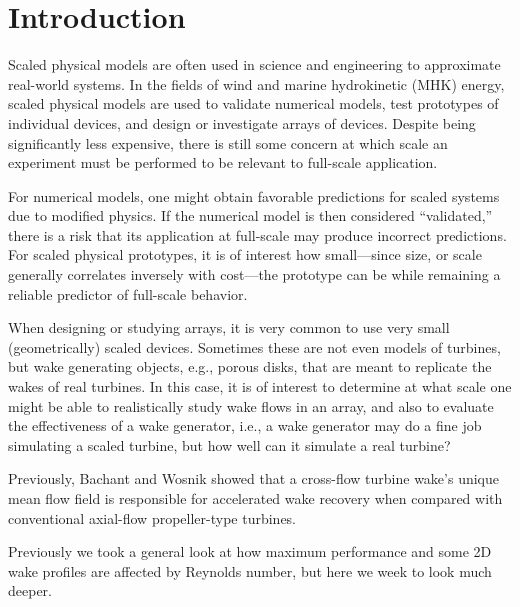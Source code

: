 \documentclass[energies,article,accept,moreauthors,pdftex,12pt,a4paper]{mdpi}
\begin{document}
\listoftodos

\section{Introduction}


Scaled physical models are often used in science and engineering to approximate
real-world systems. In the fields of wind and marine hydrokinetic (MHK) energy,
scaled physical models are used to validate numerical models, test prototypes of
individual devices, and design or investigate arrays of devices. Despite being
significantly less expensive, there is still some concern at which scale an
experiment must be performed to be relevant to full-scale application.

For numerical models, one might obtain favorable predictions for scaled systems
due to modified physics. If the numerical model is then considered
``validated,'' there is a risk that its application at full-scale may produce
incorrect predictions. For scaled physical prototypes, it is of interest how
small---since size, or scale generally correlates inversely with cost---the
prototype can be while remaining a reliable predictor of full-scale behavior.

When designing or studying arrays, it is very common to use very small
(geometrically) scaled devices. Sometimes these are not even models of turbines,
but wake generating objects, e.g., porous disks, that are meant to replicate the
wakes of real turbines. In this case, it is of interest to determine at what
scale one might be able to realistically study wake flows in an array, and also
to evaluate the effectiveness of a wake generator, i.e., a wake generator may do
a fine job simulating a scaled turbine, but how well can it simulate a real
turbine?

Previously, Bachant and Wosnik \cite{Bachant2014_JOT} showed that a cross-flow
turbine wake's unique mean flow field is responsible for accelerated wake
recovery when compared with conventional axial-flow propeller-type turbines.


Previously we took a general look at how maximum performance and some 2D wake
profiles are affected by Reynolds number, but here we week to look much deeper.
\end{document}
